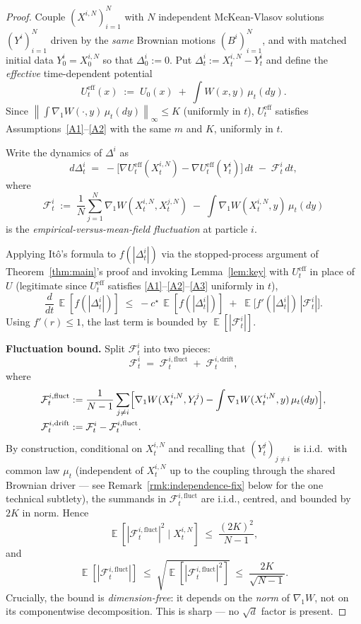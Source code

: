 \documentclass[11pt]{article}
\theoremstyle{definition}
\DeclareMathOperator{\E}{\mathbb{E}}
\newcommand{\norm}[1]{\left\lVert #1 \right\rVert}
\newcommand{\abs}[1]{\left\lvert #1 \right\rvert}
\begin{document}
\begin{proof}
Couple $(X^{i,N})_{i=1}^N$ with $N$ independent McKean-Vlasov solutions $(Y^i)_{i=1}^N$ driven by the \emph{same} Brownian motions $(B^i)_{i=1}^N$, and with matched initial data $Y^i_0 = X^{i,N}_0$ so that $\Delta^i_0 := 0$. Put $\Delta^i_t := X^{i,N}_t - Y^i_t$ and define the \emph{effective} time-dependent potential
\[
U^{\mathrm{eff}}_t(x) \;:=\; U_0(x) \;+\; \int W(x, y)\,\mu_t(dy).
\]
Since $\norm{\int \nabla_1 W(\cdot, y)\,\mu_t(dy)}_\infty \le K$ (uniformly in $t$), $U^{\mathrm{eff}}_t$ satisfies Assumptions~\ref{A1}--\ref{A2} with the same $m$ and $K$, uniformly in $t$.

Write the dynamics of $\Delta^i$ as
\[
d\Delta^i_t \;=\; -\bigl[\nabla U^{\mathrm{eff}}_t(X^{i,N}_t) - \nabla U^{\mathrm{eff}}_t(Y^i_t)\bigr]\,dt \;-\; \mathcal F^i_t\,dt,
\]
where
\[
\mathcal F^i_t \;:=\; \frac{1}{N}\sum_{j=1}^N \nabla_1 W(X^{i,N}_t, X^{j,N}_t) \;-\; \int \nabla_1 W(X^{i,N}_t, y)\,\mu_t(dy)
\]
is the \emph{empirical-versus-mean-field fluctuation} at particle $i$.

Applying It\^o's formula to $f(\abs{\Delta^i_t})$ via the stopped-process argument of Theorem~\ref{thm:main}'s proof and invoking Lemma~\ref{lem:key} with $U^{\mathrm{eff}}_t$ in place of $U$ (legitimate since $U^{\mathrm{eff}}_t$ satisfies \ref{A1}--\ref{A2}--\ref{A3} uniformly in $t$),
\[
\frac{d}{dt}\,\E[f(\abs{\Delta^i_t})] \;\le\; -c^\star\,\E[f(\abs{\Delta^i_t})] \;+\; \E\bigl[f'(\abs{\Delta^i_t})\,\abs{\mathcal F^i_t}\bigr].
\]
Using $f'(r) \le 1$, the last term is bounded by $\E[\abs{\mathcal F^i_t}]$.

\textbf{Fluctuation bound.} Split $\mathcal F^i_t$ into two pieces:
\[
\mathcal F^i_t \;=\; \mathcal F^{i,\mathrm{fluct}}_t \;+\; \mathcal F^{i,\mathrm{drift}}_t,
\]
where
\begin{align*}
\mathcal F^{i,\mathrm{fluct}}_t &:= \frac{1}{N-1}\sum_{j \ne i}\Bigl[\nabla_1 W(X^{i,N}_t, Y^j_t) - \int \nabla_1 W(X^{i,N}_t, y)\,\mu_t(dy)\Bigr], \\
\mathcal F^{i,\mathrm{drift}}_t &:= \mathcal F^i_t - \mathcal F^{i,\mathrm{fluct}}_t.
\end{align*}
By construction, conditional on $X^{i,N}_t$ and recalling that $(Y^j_t)_{j \ne i}$ is i.i.d.\ with common law $\mu_t$ (independent of $X^{i,N}_t$ up to the coupling through the shared Brownian driver --- see Remark~\ref{rmk:independence-fix} below for the one technical subtlety), the summands in $\mathcal F^{i,\mathrm{fluct}}_t$ are i.i.d., centred, and bounded by $2K$ in norm. Hence
\[
\E[\abs{\mathcal F^{i,\mathrm{fluct}}_t}^2 \mid X^{i,N}_t] \;\le\; \frac{(2K)^2}{N - 1},
\]
and
\[
\E[\abs{\mathcal F^{i,\mathrm{fluct}}_t}] \;\le\; \sqrt{\E[\abs{\mathcal F^{i,\mathrm{fluct}}_t}^2]} \;\le\; \frac{2K}{\sqrt{N - 1}}.
\]
Crucially, the bound is \emph{dimension-free}: it depends on the \emph{norm} of $\nabla_1 W$, not on its componentwise decomposition. This is sharp --- no $\sqrt d$ factor is present.


\end{proof}
\end{document}
